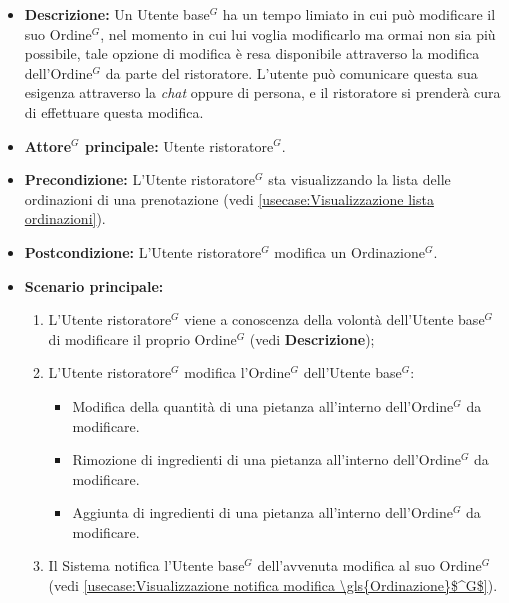 \label{usecase:Modifica \gls{Ordinazione}$^G$}
\begin{itemize}

	\item \textbf{Descrizione:} Un \gls{Utente base}$^G$ ha un tempo limiato in cui può modificare il suo \gls{Ordine}$^G$, nel momento in cui lui voglia modificarlo ma ormai non sia più possibile, tale opzione di modifica è resa disponibile
	      attraverso la modifica dell'\gls{Ordine}$^G$ da parte del ristoratore. L'utente può comunicare questa sua esigenza attraverso la \textit{chat} oppure di persona, e il ristoratore si prenderà cura di effettuare questa modifica.

	\item \textbf{\gls{Attore}$^G$ principale:} \gls{Utente ristoratore}$^G$.

	\item \textbf{Precondizione:} L'\gls{Utente ristoratore}$^G$ sta visualizzando la lista delle ordinazioni di una prenotazione (vedi \autoref{usecase:Visualizzazione lista ordinazioni}).

	\item \textbf{Postcondizione:} L'\gls{Utente ristoratore}$^G$ modifica un \gls{Ordinazione}$^G$.

	\item \textbf{Scenario principale:}
	      \begin{enumerate}
		      \item L'\gls{Utente ristoratore}$^G$ viene a conoscenza della volontà
		            dell'\gls{Utente base}$^G$ di modificare il proprio \gls{Ordine}$^G$ (vedi \textbf{Descrizione});
		      \item L'\gls{Utente ristoratore}$^G$ modifica l'\gls{Ordine}$^G$ dell'\gls{Utente base}$^G$:
		            \begin{itemize}
			            \item Modifica della quantità di una pietanza all'interno dell'\gls{Ordine}$^G$ da modificare.
			            \item Rimozione di ingredienti di una pietanza all'interno dell'\gls{Ordine}$^G$ da modificare.
			            \item Aggiunta di ingredienti di una pietanza all'interno dell'\gls{Ordine}$^G$ da modificare.
		            \end{itemize}
		      \item Il Sistema notifica l'\gls{Utente base}$^G$ dell'avvenuta modifica al suo \gls{Ordine}$^G$ (vedi \autoref{usecase:Visualizzazione notifica modifica \gls{Ordinazione}$^G$}).
	      \end{enumerate}

\end{itemize}
